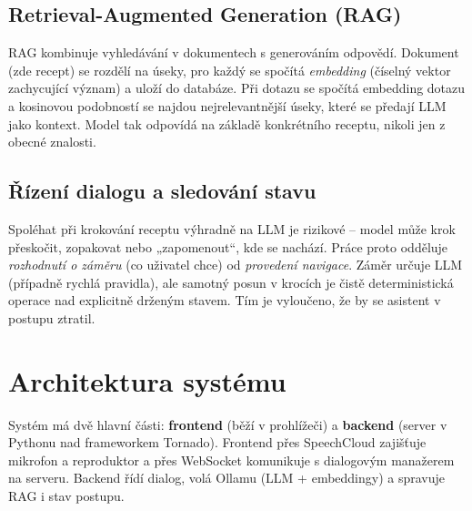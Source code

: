 \documentclass[11pt,a4paper]{article}
\begin{document}
\subsection{Retrieval-Augmented Generation (RAG)}
RAG kombinuje vyhledávání v dokumentech s generováním odpovědí. Dokument (zde recept)
se rozdělí na úseky, pro každý se spočítá \emph{embedding} (číselný vektor zachycující
význam) a uloží do databáze. Při dotazu se spočítá embedding dotazu a kosinovou
podobností se najdou nejrelevantnější úseky, které se předají LLM jako kontext.
Model tak odpovídá na základě konkrétního receptu, nikoli jen z obecné znalosti.

\subsection{Řízení dialogu a sledování stavu}
Spoléhat při krokování receptu výhradně na LLM je rizikové -- model může krok
přeskočit, zopakovat nebo „zapomenout``, kde se nachází. Práce proto odděluje
\emph{rozhodnutí o záměru} (co uživatel chce) od \emph{provedení navigace}. Záměr
určuje LLM (případně rychlá pravidla), ale samotný posun v krocích je čistě
deterministická operace nad explicitně drženým stavem. Tím je vyloučeno, že by se
asistent v postupu ztratil.

\section{Architektura systému}
Systém má dvě hlavní části: \textbf{frontend} (běží v prohlížeči) a \textbf{backend}
(server v Pythonu nad frameworkem Tornado). Frontend přes SpeechCloud zajišťuje
mikrofon a reproduktor a přes WebSocket komunikuje s dialogovým manažerem na serveru.
Backend řídí dialog, volá Ollamu (LLM + embeddingy) a spravuje RAG i stav postupu.
\end{document}
